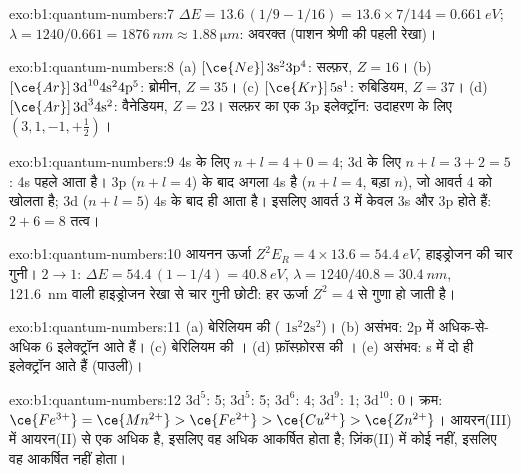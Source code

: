 \begin{solution}{exo:b1:quantum-numbers:7}
$\Delta E = 13.6\,(1/9 - 1/16) = 13.6 \times 7/144 = \qty{0.661}{eV}$;
$\lambda = 1240/0.661 = \qty{1876}{nm} \approx \qty{1.88}{\micro m}$:
अवरक्त (पाशन श्रेणी की पहली रेखा)।
\end{solution}

\begin{solution}{exo:b1:quantum-numbers:8}
(a) $[\ce{Ne}]\,3\text{s}^2 3\text{p}^4$: सल्फ़र, $Z = 16$।
(b) $[\ce{Ar}]\,3\text{d}^{10} 4\text{s}^2 4\text{p}^5$: ब्रोमीन, $Z = 35$।
(c) $[\ce{Kr}]\,5\text{s}^1$: रुबिडियम, $Z = 37$।
(d) $[\ce{Ar}]\,3\text{d}^3 4\text{s}^2$: वैनेडियम, $Z = 23$।
सल्फ़र का एक 3p इलेक्ट्रॉन: उदाहरण के लिए $(3, 1, -1, +\tfrac12)$।
\end{solution}

\begin{solution}{exo:b1:quantum-numbers:9}
4s के लिए $n + l = 4 + 0 = 4$; 3d के लिए $n + l = 3 + 2 = 5$: 4s पहले
आता है। 3p ($n + l = 4$) के बाद अगला  4s है ($n + l = 4$, बड़ा
$n$), जो आवर्त 4 को खोलता है; 3d ($n + l = 5$) 4s के बाद ही आता है।
इसलिए आवर्त 3 में केवल 3s और 3p होते हैं: $2 + 6 = 8$ तत्व।
\end{solution}

\begin{solution}{exo:b1:quantum-numbers:10}
आयनन ऊर्जा $Z^2E_R = 4 \times 13.6 = \qty{54.4}{eV}$, हाइड्रोजन की
चार गुनी। $2 \to 1$: $\Delta E = 54.4\,(1 - 1/4) = \qty{40.8}{eV}$,
$\lambda = 1240/40.8 = \qty{30.4}{nm}$, \qty{121.6}{nm} वाली हाइड्रोजन
रेखा से चार गुनी छोटी: हर ऊर्जा $Z^2 = 4$ से गुणा हो जाती है।
\end{solution}

\begin{solution}{exo:b1:quantum-numbers:11}
(a) बेरिलियम की  ( $1\text{s}^2 2\text{s}^2$)।
(b) असंभव: 2p में अधिक-से-अधिक 6 इलेक्ट्रॉन आते हैं। (c) बेरिलियम की
। (d) फ़ॉस्फ़ोरस की । (e) असंभव: s  में
दो ही इलेक्ट्रॉन आते हैं (पाउली)।
\end{solution}

\begin{solution}{exo:b1:quantum-numbers:12}
 $3\text{d}^5$: 5;  $3\text{d}^5$: 5; 
$3\text{d}^6$: 4;  $3\text{d}^9$: 1; 
$3\text{d}^{10}$: 0। क्रम: $\ce{Fe^{3+}} = \ce{Mn^{2+}} > \ce{Fe^{2+}}
> \ce{Cu^{2+}} > \ce{Zn^{2+}}$। आयरन(III) में आयरन(II) से एक  अधिक है, इसलिए वह अधिक आकर्षित होता है; ज़िंक(II) में कोई नहीं,
इसलिए वह आकर्षित नहीं होता।
\end{solution}

